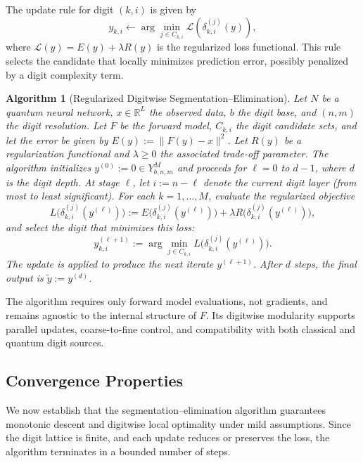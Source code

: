 \documentclass[aps,twocolumn,superscriptaddress,nofootinbib]{revtex4}
\newtheorem{algorithm}{Algorithm}
\begin{document}
The update rule for digit $(k,i)$ is given by
\begin{equation}
y_{k,i} \leftarrow \arg\min_{j \in C_{k,i}} \mathcal{L}(\delta_{k,i}^{(j)}(y)),
\end{equation}
where $\mathcal{L}(y) = E(y) + \lambda R(y)$ is the regularized loss functional. This rule selects the candidate that locally minimizes prediction error, possibly penalized by a digit complexity term.

\begin{algorithm}[Regularized Digitwise Segmentation--Elimination]
Let $N$ be a quantum neural network, $x \in \mathbb{R}^L$ the observed data, $b$ the digit base, and $(n, m)$ the digit resolution. Let $F$ be the forward model, $C_{k,i}$ the digit candidate sets, and let the error be given by $E(y) := \|F(y) - x\|^2$. Let $R(y)$ be a regularization functional and $\lambda \geq 0$ the associated trade-off parameter. The algorithm initializes $y^{(0)} := 0 \in Y^M_{b,n,m}$ and proceeds for $\ell = 0$ to $d - 1$, where $d$ is the digit depth. At stage $\ell$, let $i := n - \ell$ denote the current digit layer (from most to least significant). For each $k = 1, \ldots, M$, evaluate the regularized objective
\begin{equation}
    L\big(\delta^{(j)}_{k,i}(y^{(\ell)})\big) := E\big(\delta^{(j)}_{k,i}(y^{(\ell)})\big) + \lambda R\big(\delta^{(j)}_{k,i}(y^{(\ell)})\big), \label{eq:III.1-regularized}
\end{equation}
and select the digit that minimizes this loss:
\begin{equation}
    y^{(\ell+1)}_{k,i} := \arg\min_{j \in C_{k,i}} L\big(\delta^{(j)}_{k,i}(y^{(\ell)})\big). \label{eq:III.1-argmin}
\end{equation}
The update is applied to produce the next iterate $y^{(\ell+1)}$. After $d$ steps, the final output is $\tilde{y} := y^{(d)}$.
\end{algorithm}

The algorithm requires only forward model evaluations, not gradients, and remains agnostic to the internal structure of $F$. Its digitwise modularity supports parallel updates, coarse-to-fine control, and compatibility with both classical and quantum digit sources.
\subsection{Convergence Properties}
We now establish that the segmentation–elimination algorithm guarantees monotonic descent and digitwise local optimality under mild assumptions. Since the digit lattice is finite, and each update reduces or preserves the loss, the algorithm terminates in a bounded number of steps.
\end{document}
